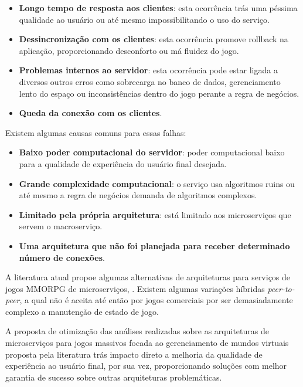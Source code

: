 \begin{itemize}
  \item \textbf{Longo tempo de resposta aos clientes}: esta ocorrência trás uma péssima qualidade ao usuário ou até mesmo impossibilitando o uso do serviço.
  \item \textbf{Dessincronização com os clientes}: esta ocorrência promove rollback na aplicação, proporcionando desconforto ou má fluidez do jogo.
  \item \textbf{Problemas internos ao servidor}: esta ocorrência pode estar ligada a diversos outros erros como sobrecarga no banco de dados, gerenciamento lento do espaço ou inconsistências dentro do jogo perante a regra de negócios.
  \item \textbf{Queda da conexão com os clientes}.
\end{itemize}

Existem algumas causas comuns para essas falhas:

\begin{itemize}
  \item \textbf{Baixo poder computacional do servidor}: poder computacional baixo para a qualidade de experiência do usuário final desejada.
  \item \textbf{Grande complexidade computacional}: o serviço usa algoritmos ruins ou até mesmo a regra de negócios demanda de algoritmos complexos.
  \item \textbf{Limitado pela própria arquitetura}: está limitado aos microserviços que servem o macroserviço.
  \item \textbf{Uma arquitetura que não foi planejada para receber determinado número de conexões}.
\end{itemize}

A literatura atual propoe algumas alternativas de arquiteturas para serviços de jogos MMORPG de microserviços, \cite{stephenclarkewillson2017} \cite{albion_online_unite}. Existem algumas variações híbridas \textit{peer-to-peer}, a qual não é aceita até então por jogos comerciais por ser demasiadamente complexo a manutenção de estado de jogo.

A proposta de otimização das análises realizadas sobre as arquiteturas de microserviços para jogos massivos focada ao gerenciamento de mundos virtuais proposta pela literatura trás impacto direto a melhoria da qualidade de experiência ao usuário final, por sua vez, proporcionando soluções com melhor garantia de sucesso sobre outras arquiteturas problemáticas.
